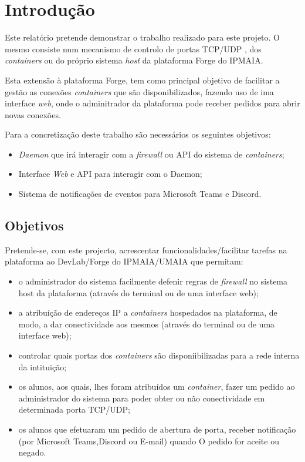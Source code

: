 \chapter{Introdução}
\label{chap:introduction}

Este relatório pretende demonstrar o trabalho realizado para este projeto.
O mesmo consiste num mecanismo de controlo de portas TCP/UDP \cite{rfc9293},
\cite{rfc768} dos \textit{containers} ou do próprio sistema \textit{host}
da plataforma Forge do IPMAIA.

Esta extensão à plataforma Forge, tem 
como principal objetivo de facilitar a gestão as conexões \textit{containers} 
que são disponibilizados, fazendo uso de ima interface \textit{web}, onde o adminitrador da 
plataforma pode receber pedidos para abrir novas conexões. 

Para a concretização deste trabalho são necessários os seguintes objetivos:\\

\begin{itemize}
\item \textit{Daemon} que irá interagir com a \textit{firewall} ou API do sistema de \textit{containers};
\item Interface \textit{Web} e API para interagir com o Daemon;
\item Sistema de notificações de eventos para Microsoft Teams e Discord.
\end{itemize}


\section{Objetivos}
\label{sec:object}

Pretende-se, com este projecto, acrescentar funcionalidades/facilitar tarefas na plataforma ao
DevLab/Forge do IPMAIA/UMAIA que permitam:

\begin{itemize}
\item o administrador do sistema facilmente defenir regras de \textit{firewall} no sistema host da plataforma (através do terminal ou de uma interface web);
\item a atribuíção de endereços IP a \textit{containers} hospedados na plataforma, de modo,
a dar conectividade aos mesmos (através do terminal ou de uma interface web);
\item controlar quais portas dos \textit{containers} são disponiibilizadas para a rede interna da intituição;
\item os alunos, aos quais, lhes foram atribuídos um \textit{container}, fazer um pedido ao administrador do sistema para poder
obter ou não conectividade em determinada porta TCP/UDP;
\item os alunos que efetuaram um pedido de abertura de porta, receber notificação (por Microsoft Teams,Discord ou E-mail) quando O
pedido for aceite ou negado.

\end{itemize}

